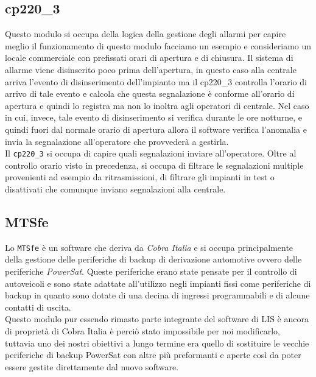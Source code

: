 \subsection{cp220\_3}
Questo modulo si occupa della logica della gestione degli allarmi per capire meglio il funzionamento di questo modulo facciamo un esempio e consideriamo un locale commerciale con prefissati orari di apertura e di chiusura. Il sistema di allarme viene disinserito poco prima dell'apertura, in questo caso alla centrale arriva l'evento di disinserimento dell'impianto ma il cp220\_3 controlla l'orario di arrivo di tale evento e calcola che questa segnalazione è conforme all'orario di apertura e quindi lo registra ma non lo inoltra agli operatori di centrale. Nel caso in cui, invece, tale evento di disinserimento si verifica durante le ore notturne, e quindi fuori dal normale orario di apertura allora il software verifica l'anomalia e invia la segnalazione all'operatore che provvederà a gestirla.\\
Il \texttt{cp220\_3} si occupa di capire quali segnalazioni inviare all'operatore. Oltre al controllo orario visto in precedenza, si occupa di filtrare le segnalazioni multiple provenienti ad esempio da ritrasmissioni, di filtrare gli impianti in test o disattivati che comunque inviano segnalazioni alla centrale.
\subsection{MTSfe}
Lo \texttt{MTSfe} è un software che deriva da \emph{Cobra Italia} e si occupa principalmente della gestione delle periferiche di backup di derivazione automotive ovvero delle periferiche \emph{PowerSat}. Queste periferiche erano state pensate per il controllo di autoveicoli e sono state adattate all'utilizzo negli impianti fissi come periferiche di backup in quanto sono dotate di una decina di ingressi programmabili e di alcune contatti di uscita.\\
Questo modulo pur essendo rimasto parte integrante del software di LIS è ancora di proprietà di Cobra Italia è perciò stato impossibile per noi modificarlo, tuttavia uno dei nostri obiettivi a lungo termine era quello di sostituire le vecchie periferiche di backup PowerSat con altre più preformanti e aperte così da poter essere gestite direttamente dal nuovo software.
